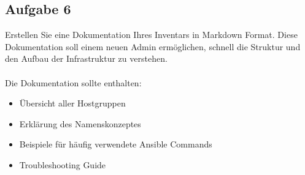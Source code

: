 \documentclass{article}
\begin{document}
    \subsection{Aufgabe 6}
    Erstellen Sie eine Dokumentation Ihres Inventars in Markdown Format.
    Diese Dokumentation soll einem neuen Admin ermöglichen, schnell die Struktur und den Aufbau der Infrastruktur zu verstehen.
    \\ \\
    Die Dokumentation sollte enthalten:
    \begin{itemize}
        \item Übersicht aller Hostgruppen
        \item Erklärung des Namenskonzeptes
        \item Beispiele für häufig verwendete Ansible Commands
        \item Troubleshooting Guide
    \end{itemize}
\end{document}
